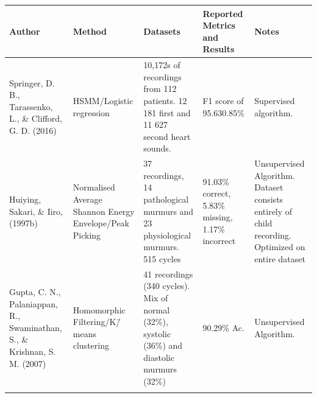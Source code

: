 \documentclass[titlepage, 12pt]{scrartcl} \usepackage{enumitem}
\newcommand{\dtoprule}{\specialrule{1pt}{0pt}{1.4pt}%
            \specialrule{1pt}{0pt}{\belowrulesep}%
            }
\newcommand{\dbottomrule}{\specialrule{1pt}{0pt}{1.4pt}%
            \specialrule{1pt}{0pt}{\belowrulesep}%
            }
\begin{document}
\begin{landscape}
\begin{table}[htbp]
     \label{SegmentationTable}
\small
\begin{tabulary}{\linewidth}{LLLLL}
\dtoprule
Author                                                                    & Method                                                  & Datasets                                                                                       & Reported Metrics and Results                      & Notes                                                                                              \\ \midrule
Springer, D. B., Tarassenko, L., \& Clifford, G. D. (2016)                & HSMM/Logistic regression                                & 10,172s of recordings from 112 patients. 12 181 first and 11 627 second heart sounds.          & F1 score of 95.630.85\%                          & Supervised algorithm.                                                                              \\
Huiying, Sakari, \& Iiro, (1997b)                                         & Normalised Average Shannon Energy Envelope/Peak Picking & 37 recordings, 14 pathological murmurs and 23 physiological murmurs. 515 cycles                & 91.03\% correct, 5.83\% missing, 1.17\% incorrect & Unsupervised Algorithm.  Dataset consists entirely of child recording. Optimized on entire dataset \\
Gupta, C. N., Palaniappan, R., Swaminathan, S., \& Krishnan, S. M. (2007) &
Homomorphic Filtering\slash K\=/means clustering                & 41 recordings (340 cycles). Mix of normal (32\%), systolic (36\%) and diastolic murmurs (32\%) & 90.29\% Ac.                           & Unsupervised Algorithm.                                                                            \\
\dbottomrule \\
\end{tabulary}
\end{table}
\end{landscape}
\restoregeometry
\end{document}
